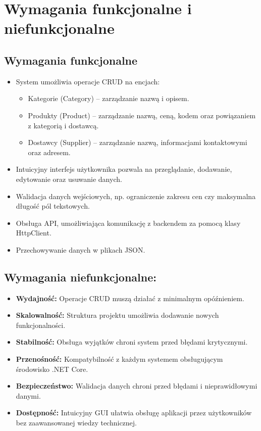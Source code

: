 

\chapter{Wymagania funkcjonalne i niefunkcjonalne} \noindent \section{Wymagania funkcjonalne} \begin{itemize} \item System umożliwia operacje CRUD na encjach: \begin{itemize} \item Kategorie (Category) – zarządzanie nazwą i opisem. \item Produkty (Product) – zarządzanie nazwą, ceną, kodem oraz powiązaniem z kategorią i dostawcą. \item Dostawcy (Supplier) – zarządzanie nazwą, informacjami kontaktowymi oraz adresem. \end{itemize} \item Intuicyjny interfejs użytkownika pozwala na przeglądanie, dodawanie, edytowanie oraz usuwanie danych. \item Walidacja danych wejściowych, np. ograniczenie zakresu cen czy maksymalna długość pól tekstowych. \item Obsługa API, umożliwiająca komunikację z backendem za pomocą klasy HttpClient. \item Przechowywanie danych w plikach JSON. \end{itemize}

\noindent \section{Wymagania niefunkcjonalne:} \begin{itemize} \item \textbf{Wydajność:} Operacje CRUD muszą działać z minimalnym opóźnieniem. \item \textbf{Skalowalność:} Struktura projektu umożliwia dodawanie nowych funkcjonalności. \item \textbf{Stabilność:} Obsługa wyjątków chroni system przed błędami krytycznymi. \item \textbf{Przenośność:} Kompatybilność z każdym systemem obsługującym środowisko .NET Core. \item \textbf{Bezpieczeństwo:} Walidacja danych chroni przed błędami i nieprawidłowymi danymi. \item \textbf{Dostępność:} Intuicyjny GUI ułatwia obsługę aplikacji przez użytkowników bez zaawansowanej wiedzy technicznej. \end{itemize}


